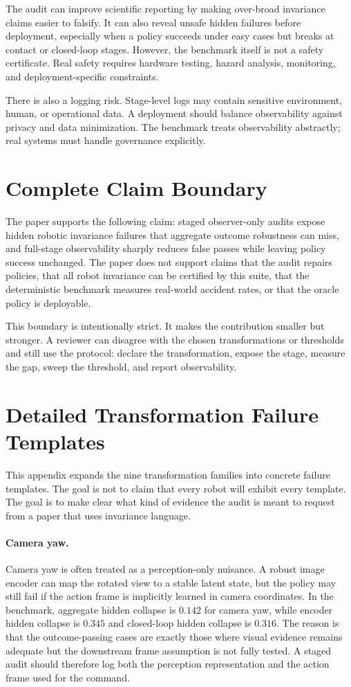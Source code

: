 \documentclass{article}
\begin{document}
The audit can improve scientific reporting by making over-broad invariance claims easier to falsify. It can also reveal unsafe hidden failures before deployment, especially when a policy succeeds under easy cases but breaks at contact or closed-loop stages. However, the benchmark itself is not a safety certificate. Real safety requires hardware testing, hazard analysis, monitoring, and deployment-specific constraints.

There is also a logging risk. Stage-level logs may contain sensitive environment, human, or operational data. A deployment should balance observability against privacy and data minimization. The benchmark treats observability abstractly; real systems must handle governance explicitly.

\section{Complete Claim Boundary}

The paper supports the following claim: staged observer-only audits expose hidden robotic invariance failures that aggregate outcome robustness can miss, and full-stage observability sharply reduces false passes while leaving policy success unchanged. The paper does not support claims that the audit repairs policies, that all robot invariance can be certified by this suite, that the deterministic benchmark measures real-world accident rates, or that the oracle policy is deployable.

This boundary is intentionally strict. It makes the contribution smaller but stronger. A reviewer can disagree with the chosen transformations or thresholds and still use the protocol: declare the transformation, expose the stage, measure the gap, sweep the threshold, and report observability.

\section{Detailed Transformation Failure Templates}

This appendix expands the nine transformation families into concrete failure templates. The goal is not to claim that every robot will exhibit every template. The goal is to make clear what kind of evidence the audit is meant to request from a paper that uses invariance language.

\paragraph{Camera yaw.}
Camera yaw is often treated as a perception-only nuisance. A robust image encoder can map the rotated view to a stable latent state, but the policy may still fail if the action frame is implicitly learned in camera coordinates. In the benchmark, aggregate hidden collapse is $0.142$ for camera yaw, while encoder hidden collapse is $0.345$ and closed-loop hidden collapse is $0.316$. The reason is that the outcome-passing cases are exactly those where visual evidence remains adequate but the downstream frame assumption is not fully tested. A staged audit should therefore log both the perception representation and the action frame used for the command.
\end{document}
